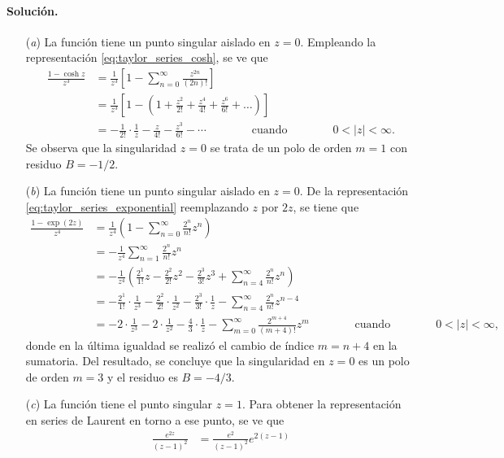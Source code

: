 \documentclass[a4paper]{report}
\begin{document}
\paragraph{Solución.} 
\begin{enumerate}
 \item[(\textit{a})] La función tiene un punto singular aislado en \(z=0\). Empleando la representación \ref{eq:taylor_series_cosh}, se ve que 
 \begin{align*}
  \frac{1-\cosh z}{z^3}&=\frac{1}{z^3}\left[1-\sum_{n=0}^\infty\frac{z^{2n}}{(2n)!}\right]\\
   &=\frac{1}{z^3}\left[1-\left(1+\frac{z^2}{2!}+\frac{z^4}{4!}+\frac{z^6}{6!}+\dots\right)\right]\\
   &=-\frac{1}{2!}\cdot\frac{1}{z}-\frac{z}{4!}-\frac{z^3}{6!}-\cdots
  \qquad\qquad\textrm{cuando}\qquad\qquad
 0<|z|<\infty.
 \end{align*}
 Se observa que la singularidad \(z=0\) se trata de un polo de orden \(m=1\) con residuo \(B=-1/2\).
 \item[(\textit{b})] La función tiene un punto singular aislado en \(z=0\). De la representación \ref{eq:taylor_series_exponential} reemplazando \(z\) por \(2z\), se tiene que 
 \begin{align*}
  \frac{1-\exp(2z)}{z^4}&=\frac{1}{z^4}\left(1-\sum_{n=0}^\infty\frac{2^n}{n!}z^n\right)\\
   &=-\frac{1}{z^4}\sum_{n=1}^\infty\frac{2^n}{n!}z^n\\
   &=-\frac{1}{z^4}\left(\frac{2^1}{1!}z-\frac{2^2}{2!}z^2-\frac{2^3}{3!}z^3+\sum_{n=4}^\infty\frac{2^n}{n!}z^n\right)\\
   &=-\frac{2^1}{1!}\cdot\frac{1}{z^3}-\frac{2^2}{2!}\cdot\frac{1}{z^2}-\frac{2^3}{3!}\cdot\frac{1}{z}-\sum_{n=4}^\infty\frac{2^n}{n!}z^{n-4}\\
   &=-2\cdot\frac{1}{z^3}-2\cdot\frac{1}{z^2}-\frac{4}{3}\cdot\frac{1}{z}-\sum_{m=0}^\infty\frac{2^{m+4}}{(m+4)!}z^m
  \qquad\qquad\textrm{cuando}\qquad\qquad
  0<|z|<\infty,
 \end{align*}
 donde en la última igualdad se realizó el cambio de índice \(m=n+4\) en la sumatoria.
 Del resultado, se concluye que la singularidad en \(z=0\) es un polo de orden \(m=3\) y el residuo es \(B=-4/3\).
 \item[(\textit{c})] La función tiene el punto singular \(z=1\). Para obtener la representación en series de Laurent en torno a ese punto, se ve que 
 \begin{align*}
  \frac{e^{2z}}{(z-1)^2}&=\frac{e^2}{(z-1)^2}e^{2(z-1)}\\

\end{align*}
\end{enumerate}
\end{document}
